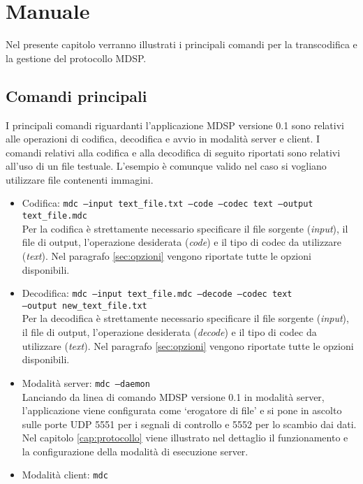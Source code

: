 \chapter{Manuale}
Nel presente capitolo verranno illustrati i principali comandi per la
transcodifica e la gestione del protocollo MDSP.

\section{Comandi principali}
I principali comandi riguardanti l'applicazione MDSP versione 0.1 sono relativi
alle operazioni di codifica, decodifica e avvio in modalità server e client. I
comandi relativi alla codifica e alla decodifica di seguito riportati sono
relativi all'uso di un file testuale. L'esempio è comunque valido nel caso si
vogliano utilizzare file contenenti immagini.

\begin{itemize}
  \item Codifica: \texttt{mdc --input text\_file.txt --code --codec text
  --output text\_file.mdc}\\ Per la codifica è strettamente necessario
  specificare il file sorgente (\emph{input}), il file di output, l'operazione desiderata (\emph{code}) e il
tipo di codec da utilizzare (\emph{text}). Nel paragrafo \ref{sec:opzioni} vengono riportate tutte le opzioni disponibili. 
  \item Decodifica: \texttt{mdc --input text\_file.mdc --decode --codec
  text\\ --output new\_text\_file.txt}\\ Per la decodifica è strettamente
  necessario specificare il file sorgente (\emph{input}), il file di output, l'operazione desiderata (\emph{decode}) e il
tipo di codec da utilizzare (\emph{text}). Nel paragrafo \ref{sec:opzioni} vengono riportate tutte le opzioni disponibili.
  \item Modalità server: \texttt{mdc --daemon}\\ Lanciando da linea di comando
  MDSP versione 0.1 in modalità server, l'applicazione viene configurata come `erogatore di file' e si pone in ascolto
sulle porte UDP 5551 per i segnali di controllo e 5552 per lo scambio dai dati. Nel capitolo \ref{cap:protocollo} viene illustrato nel dettaglio il
funzionamento e la configurazione della modalità di esecuzione server.
  \item Modalità client: \texttt{mdc}
\end{itemize}

